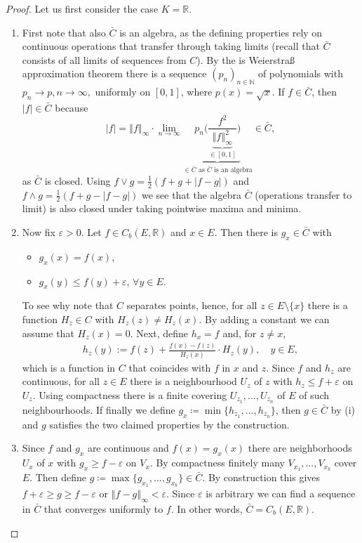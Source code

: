 \begin{proof}[Proof]
Let us first consider the case $K = \mathbb{R}$.
\begin{enumerate}[label=(\roman*)]
	\item First note that also $\bar C$ is an algebra, as the defining properties rely on continuous operations that transfer through taking limits (recall that $\bar C$ consists of all limits of sequences from $C$). By the  is Weierstra\ss{} approximation theorem there is a sequence $(p_n)_{n\in \mathbb{N}}$ of polynomials with $p_n \to p,n\to \infty,$ uniformly on $[0,1]$, where $p(x) = \sqrt{x}$. If $f \in \bar{C}$, then $\lvert f \rvert \in \bar{C}$ because $$ \lvert f \rvert = \left\Vert f \right\Vert_{\infty} \cdot {\lim_{n\to\infty} \underbrace{p_n \Big( \frac{f^2}{ \underbrace{\left\Vert f \right\Vert_{\infty}^2}_{\in [0,1]}}\Big)}_{\in \bar C \text{ as }\bar{C} \text{ is an algebra}}}\in \bar C,$$
		as $\bar C$ is closed. Using $f \vee g = \frac{1}{2} ( f + g + \lvert f - g \rvert )$ and $ f \wedge g = \frac{1}{2} ( f + g - \lvert f - g \rvert )$ we see that the algebra $\bar{C}$ (operations transfer to limit) is also closed under taking pointwise maxima and minima.
	\item
		Now fix $\varepsilon>0$. Let $f \in C_b(E, \mathbb{R})$ and $x \in E$. Then there is $g_x \in \bar{C}$ with 
		\begin{itemize}
			\item $g_x(x) = f(x)$,
			\item $g_x(y) \leq f(y) + \varepsilon$, $\forall y \in E$.
		\end{itemize}
		To see why note that $C$ separates points, hence, for all $z \in E \setminus \{x \}$ there is a function $H_z \in C$ with $H_z(z) \neq H_z(x).$ By adding a constant we can assume that $H_z(x)=0$. Next, define $h_x=f$ and, for $z\neq x$,
		\begin{align*}
			h_z(y) := 
				 f(z) + \frac{f(x)-f(z)}{H_z(x)}\cdot H_z(y),\quad y\in E,
		\end{align*}
		which is a function in $C$ that coincides with $f$ in $x$ and $z$.
		Since $f$ and $h_z$ are continuous, for all $z \in E$ there is a neighbourhood $U_z $ of $z$ with $h_z \leq f + \varepsilon$ on $U_z$. Using compactness there is a finite covering $U_{z_1},..., U_{z_n}$ of $E$ of such neighbourhoods. If finally we define $g_x \coloneqq \min \{h_{z_1},...,h_{z_n} \}$, then $g\in \bar C$ by (i) and $g$ satisfies the two claimed properties by the construction.
	\item
		Since $f$ and $g_x$ are continuous and $f(x) = g_x(x)$ there are neighborhoods $U_x$ of $x$ with $g_x \geq f - \varepsilon$ on $V_x$. By compactness finitely many $V_{x_1},...,V_{x_k}$ cover $E$. Then define $g \coloneqq \max \{ g_{x_1},...,g_{x_k} \} \in \bar{C}$. By construction this gives $f + \varepsilon \geq g \geq f - \varepsilon$ or $\left\Vert f - g \right\Vert_{\infty} < \varepsilon$. Since $\varepsilon$ is arbitrary we can find a sequence in $\bar C$ that converges uniformly to $f$. In other words, $\bar{C} = C_b(E, \mathbb{R})$.

\end{enumerate}
\end{proof}
